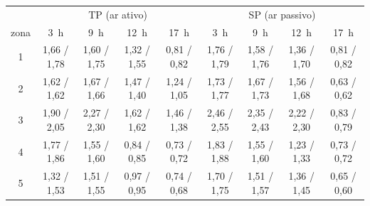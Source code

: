 \begin{tabular}{c|cccc|cccc}
\toprule
 & \multicolumn{4}{c|}{TP (ar ativo)} & \multicolumn{4}{c}{SP (ar passivo)}\\
zona & 3~h & 9~h & 12~h & 17~h & 3~h & 9~h & 12~h & 17~h\\
\midrule
1 & 1{,}66 / 1{,}78 & 1{,}60 / 1{,}75 & 1{,}32 / 1{,}55 & 0{,}81 / 0{,}82 & 1{,}76 / 1{,}79 & 1{,}58 / 1{,}76 & 1{,}36 / 1{,}70 & 0{,}81 / 0{,}82 \\
2 & 1{,}62 / 1{,}62 & 1{,}67 / 1{,}66 & 1{,}47 / 1{,}40 & 1{,}24 / 1{,}05 & 1{,}73 / 1{,}77 & 1{,}67 / 1{,}73 & 1{,}56 / 1{,}68 & 0{,}63 / 0{,}62 \\
3 & 1{,}90 / 2{,}05 & 2{,}27 / 2{,}30 & 1{,}62 / 1{,}62 & 1{,}46 / 1{,}38 & 2{,}46 / 2{,}55 & 2{,}35 / 2{,}43 & 2{,}22 / 2{,}30 & 0{,}83 / 0{,}79 \\
4 & 1{,}77 / 1{,}86 & 1{,}55 / 1{,}60 & 0{,}84 / 0{,}85 & 0{,}73 / 0{,}72 & 1{,}83 / 1{,}88 & 1{,}55 / 1{,}60 & 1{,}23 / 1{,}33 & 0{,}73 / 0{,}72 \\
5 & 1{,}32 / 1{,}53 & 1{,}51 / 1{,}55 & 0{,}97 / 0{,}95 & 0{,}74 / 0{,}68 & 1{,}70 / 1{,}75 & 1{,}51 / 1{,}57 & 1{,}36 / 1{,}45 & 0{,}65 / 0{,}60 \\
\bottomrule
\end{tabular}
